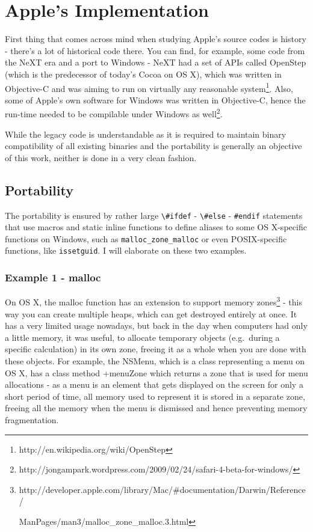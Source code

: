 \chapter{Apple's Implementation}

First thing that comes across mind when studying Apple's source codes is history - there's a lot of historical code there. You can find, for example, some code from the NeXT era and a port to Windows - NeXT had a set of APIs called OpenStep (which is the predecessor of today's Cocoa on OS X), which was written in Objective-C and was aiming to run on virtually any reasonable system\footnote{http://en.wikipedia.org/wiki/OpenStep}. Also, some of Apple's own software for Windows was written in Objective-C, hence the run-time needed to be compilable under Windows as well\footnote{http://jongampark.wordpress.com/2009/02/24/safari-4-beta-for-windows/}.

While the legacy code is understandable as it is required to maintain binary compatibility of all existing binaries and the portability is generally an objective of this work, neither is done in a very clean fashion.

\section{Portability}
The portability is ensured by rather large \verb=\#ifdef= - \verb=\#else= - \verb=#endif= statements that use macros and static inline functions to define aliases to some OS X-specific functions on Windows, such as \verb=malloc_zone_malloc= or even POSIX-specific functions, like \verb=issetguid=. I will elaborate on these two examples.

\subsection{Example 1 - malloc}
On OS X, the malloc function has an extension to support memory zones\footnote{http://developer.apple.com/library/Mac/\#documentation/Darwin/Reference/

ManPages/man3/malloc\_zone\_malloc.3.html} - this way you can create multiple heaps, which can get destroyed entirely at once. It has a very limited usage nowadays, but back in the day when computers had only a little memory, it was useful, to allocate temporary objects (e.g.\ during a specific calculation) in its own zone, freeing it as a whole when you are done with these objects. For example, the NSMenu, which is a class representing a menu on OS X, has a class method +menuZone which returns a zone that is used for menu allocations - as a menu is an element that gets displayed on the screen for only a short period of time, all memory used to represent it is stored in a separate zone, freeing all the memory when the menu is dismissed and hence preventing memory fragmentation.

